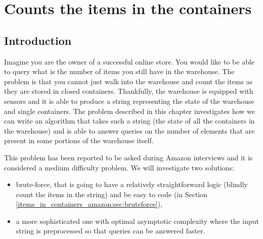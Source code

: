 %

\chapter{Counts the items in the containers}
\label{ch:items_in_containers_amazon}
\section*{Introduction}
Imagine you are the owner of a successful online store. You would like to be able to query what is
the number of items you still have in the warehouse. The problem is that you cannot just walk into
the warehouse and count the items as they are stored in closed containers. Thankfully, the warehouse
is equipped with sensors and it is able to produce a string representing the state of the warehouse
and single containers. The problem described in this chapter investigates how we can write an
algorithm that takes such a string (the state of all the containers in the warehouse) and is able to
answer queries on the number of elements that are present in some portions of the warehouse itself. 

This problem has been reported to be asked during Amazon interviews and it is considered a medium
difficulty problem. We will investigate two solutions:
\begin{itemize}
	\item brute-force, that is going to have a relatively straightforward logic (blindly count the
	 items in the string) and be easy to code (in Section
	 \ref{items_in_containers_amazon:sec:bruteforce}),
	\item a more sophisticated one with optimal asymptotic complexity where the input string is
	preprocessed so that queries can be answered faster.
\end{itemize}



